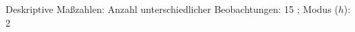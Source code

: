 				\label{tableValues:bsch17a_g2}
				\vspace*{-\baselineskip}
                    \begin{noten}
                	    \note{} Deskriptive Maßzahlen:
                	    Anzahl unterschiedlicher Beobachtungen: 15%
                	    ; 
                	      Modus ($h$): 2
                     \end{noten}


